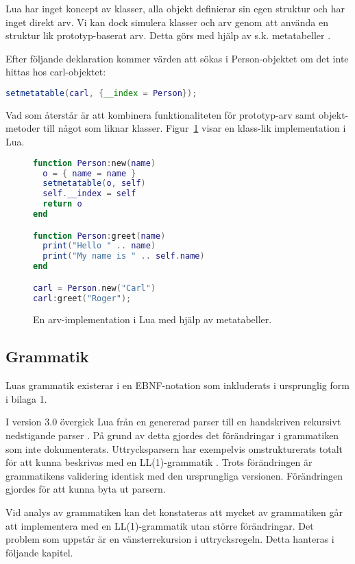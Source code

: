 Lua har inget koncept av klasser, alla objekt definierar sin egen struktur och
har inget direkt arv. Vi kan dock simulera klasser och arv genom att använda
en struktur lik prototyp-baserat arv. Detta görs med hjälp av s.k.
metatabeller \citep[s. 151]{ir06}.

Efter följande deklaration kommer värden att sökas i Person-objektet om det
inte hittas hos carl-objektet:
\\

\begin{lstlisting}[language=Lua]
setmetatable(carl, {__index = Person});
\end{lstlisting}
\vspace{-2em}
Vad som återstår är att kombinera funktionaliteten för prototyp-arv samt
objekt-metoder till något som liknar klasser. Figur~\ref{fig:class} visar en
klass-lik implementation i Lua.

\begin{figure}[ht]
  \begin{lstlisting}[language=Lua]
function Person:new(name)
  o = { name = name }
  setmetatable(o, self)
  self.__index = self
  return o
end

function Person:greet(name)
  print("Hello " .. name)
  print("My name is " .. self.name)
end

carl = Person.new("Carl")
carl:greet("Roger");
  \end{lstlisting}
  \caption{En arv-implementation i Lua med hjälp av metatabeller.}
  \label{fig:class}
\end{figure}

\subsection{Grammatik}

Luas grammatik existerar i en EBNF-notation som inkluderats i
ursprunglig form i bilaga 1.

I version 3.0 övergick Lua från en genererad parser till en handskriven
rekursivt nedstigande parser \citep{luaimp}. På grund av detta gjordes det
förändringar i grammatiken som inte dokumenterats. Uttrycksparsern har
exempelvis omstrukturerats totalt för att kunna beskrivas med en
LL(1)-grammatik \citep[s. 175]{bf09}. Trots förändringen är grammatikens
validering identisk med den ursprungliga versionen. Förändringen gjordes för
att kunna byta ut parsern.

Vid analys av grammatiken kan det konstateras att mycket av grammatiken går att
implementera med en LL(1)-grammatik utan större förändringar. Det problem som
uppstår är en vänsterrekursion i uttrycksregeln. Detta hanteras i följande
kapitel.

